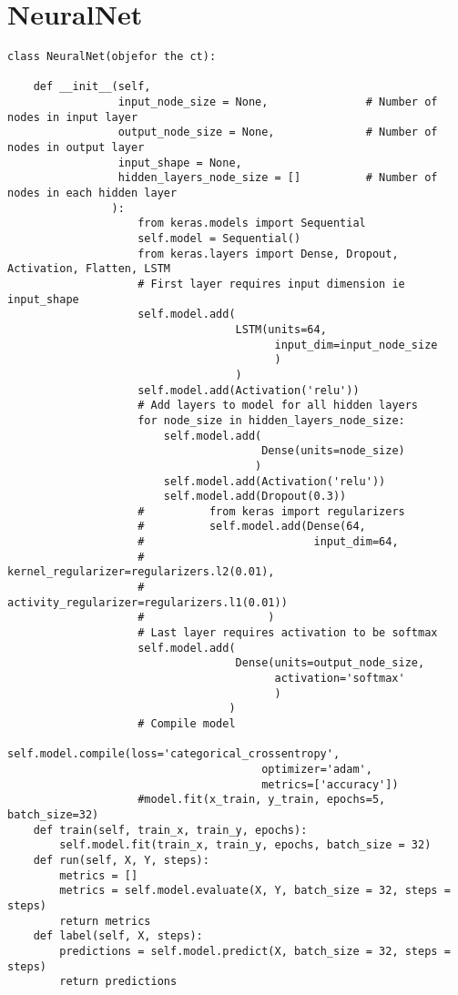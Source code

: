 \documentclass[11pt]{article}
\begin{document}
\section{NeuralNet}
\label{sec:org6051a91}
\begin{verbatim}
class NeuralNet(objefor the ct):

    def __init__(self,
                 input_node_size = None,               # Number of nodes in input layer
                 output_node_size = None,              # Number of nodes in output layer
                 input_shape = None,
                 hidden_layers_node_size = []          # Number of nodes in each hidden layer
                ):
                    from keras.models import Sequential
                    self.model = Sequential()
                    from keras.layers import Dense, Dropout, Activation, Flatten, LSTM
                    # First layer requires input dimension ie input_shape
                    self.model.add(
                                   LSTM(units=64,
                                         input_dim=input_node_size
                                         )
                                   )
                    self.model.add(Activation('relu'))
                    # Add layers to model for all hidden layers
                    for node_size in hidden_layers_node_size:
                        self.model.add(
                                       Dense(units=node_size)
                                      )
                        self.model.add(Activation('relu'))
                        self.model.add(Dropout(0.3))
                    #          from keras import regularizers
                    #          self.model.add(Dense(64,
                    #                          input_dim=64,
                    #                          kernel_regularizer=regularizers.l2(0.01),
                    #                          activity_regularizer=regularizers.l1(0.01))
                    #                   )
                    # Last layer requires activation to be softmax
                    self.model.add(
                                   Dense(units=output_node_size,
                                         activation='softmax'
                                         )
                                  )
                    # Compile model
                    self.model.compile(loss='categorical_crossentropy',
                                       optimizer='adam',
                                       metrics=['accuracy'])
                    #model.fit(x_train, y_train, epochs=5, batch_size=32)
    def train(self, train_x, train_y, epochs):
        self.model.fit(train_x, train_y, epochs, batch_size = 32)
    def run(self, X, Y, steps):
        metrics = []
        metrics = self.model.evaluate(X, Y, batch_size = 32, steps = steps)
        return metrics
    def label(self, X, steps):
        predictions = self.model.predict(X, batch_size = 32, steps = steps)
        return predictions
\end{verbatim}
\end{document}
